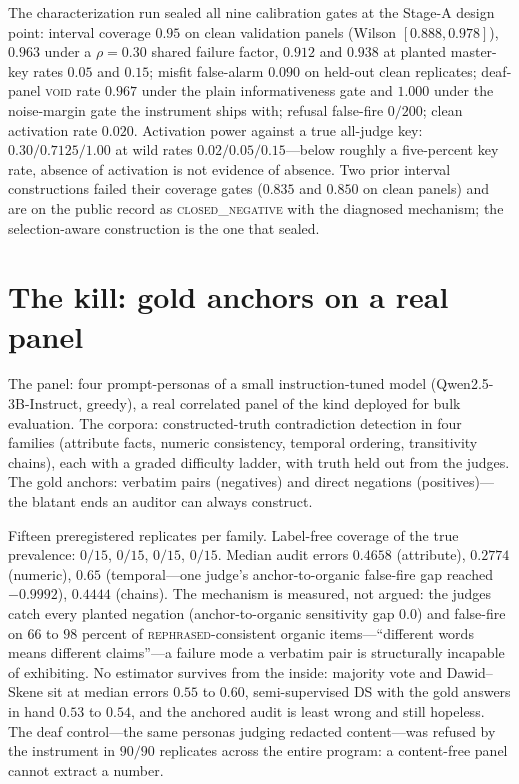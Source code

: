 \documentclass[11pt]{article}
\begin{document}
The characterization run sealed all nine calibration gates at the Stage-A design point: interval
coverage $0.95$ on clean validation panels (Wilson $[0.888, 0.978]$), $0.963$ under a $\rho=0.30$
shared failure factor, $0.912$ and $0.938$ at planted master-key rates $0.05$ and $0.15$; misfit
false-alarm $0.090$ on held-out clean replicates; deaf-panel \textsc{void} rate $0.967$ under the
plain informativeness gate and $1.000$ under the noise-margin gate the instrument ships with; refusal
false-fire $0/200$; clean activation rate $0.020$. Activation power against a true all-judge key:
$0.30 / 0.7125 / 1.00$ at wild rates $0.02 / 0.05 / 0.15$---below roughly a five-percent key rate,
absence of activation is not evidence of absence. Two prior interval constructions failed their
coverage gates ($0.835$ and $0.850$ on clean panels) and are on the public record as
\textsc{closed\_negative} with the diagnosed mechanism; the selection-aware construction is the one
that sealed.

\section{The kill: gold anchors on a real panel}

The panel: four prompt-personas of a small instruction-tuned model (Qwen2.5-3B-Instruct, greedy), a
real correlated panel of the kind deployed for bulk evaluation. The corpora: constructed-truth
contradiction detection in four families (attribute facts, numeric consistency, temporal ordering,
transitivity chains), each with a graded difficulty ladder, with truth held out from the judges. The
gold anchors: verbatim pairs (negatives) and direct negations (positives)---the blatant ends an
auditor can always construct.

Fifteen preregistered replicates per family. Label-free coverage of the true prevalence: $0/15$,
$0/15$, $0/15$, $0/15$. Median audit errors $0.4658$ (attribute), $0.2774$ (numeric), $0.65$
(temporal---one judge's anchor-to-organic false-fire gap reached $-0.9992$), $0.4444$ (chains). The
mechanism is measured, not argued: the judges catch every planted negation (anchor-to-organic
sensitivity gap $0.0$) and false-fire on $66$ to $98$ percent of \textsc{rephrased}-consistent organic
items---``different words means different claims''---a failure mode a verbatim pair is structurally
incapable of exhibiting. No estimator survives from the inside: majority vote and Dawid--Skene sit at
median errors $0.55$ to $0.60$, semi-supervised DS with the gold answers in hand $0.53$ to $0.54$, and
the anchored audit is least wrong and still hopeless. The deaf control---the same personas judging
redacted content---was refused by the instrument in $90/90$ replicates across the entire program: a
content-free panel cannot extract a number.
\end{document}
